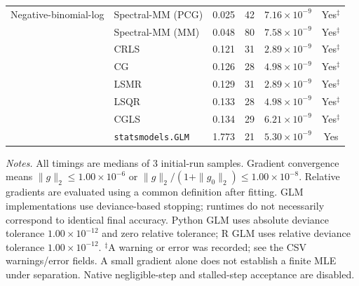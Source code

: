 \begin{longtable}{llrrrc}
\midrule
Negative-binomial-log & Spectral-MM (PCG) & 0.025 & 42 & $7.16\times10^{-9}$ & Yes$^{\ddagger}$ \\
 & Spectral-MM (MM) & 0.048 & 80 & $7.58\times10^{-9}$ & Yes$^{\ddagger}$ \\
 & CRLS & 0.121 & 31 & $2.89\times10^{-9}$ & Yes$^{\ddagger}$ \\
 & CG & 0.126 & 28 & $4.98\times10^{-9}$ & Yes$^{\ddagger}$ \\
 & LSMR & 0.129 & 31 & $2.89\times10^{-9}$ & Yes$^{\ddagger}$ \\
 & LSQR & 0.133 & 28 & $4.98\times10^{-9}$ & Yes$^{\ddagger}$ \\
 & CGLS & 0.134 & 29 & $6.21\times10^{-9}$ & Yes$^{\ddagger}$ \\
 & \texttt{statsmodels.GLM} & 1.773 & 21 & $5.30\times10^{-9}$ & Yes \\
\end{longtable}
\noindent\textit{Notes.} All timings are medians of 3 initial-run samples.
Gradient convergence means $\|g\|_2\leq 1.00\times10^{-6}$ or $\|g\|_2/(1+\|g_0\|_2)\leq 1.00\times10^{-8}$.
Relative gradients are evaluated using a common definition after fitting. GLM implementations use deviance-based stopping; runtimes do not necessarily correspond to identical final accuracy.
Python GLM uses absolute deviance tolerance $1.00\times10^{-12}$ and zero relative tolerance; R GLM uses relative deviance tolerance $1.00\times10^{-12}$.
$^{\ddagger}$A warning or error was recorded; see the CSV warnings/error fields. A small gradient alone does not establish a finite MLE under separation.
Native negligible-step and stalled-step acceptance are disabled.
\par
\endgroup
